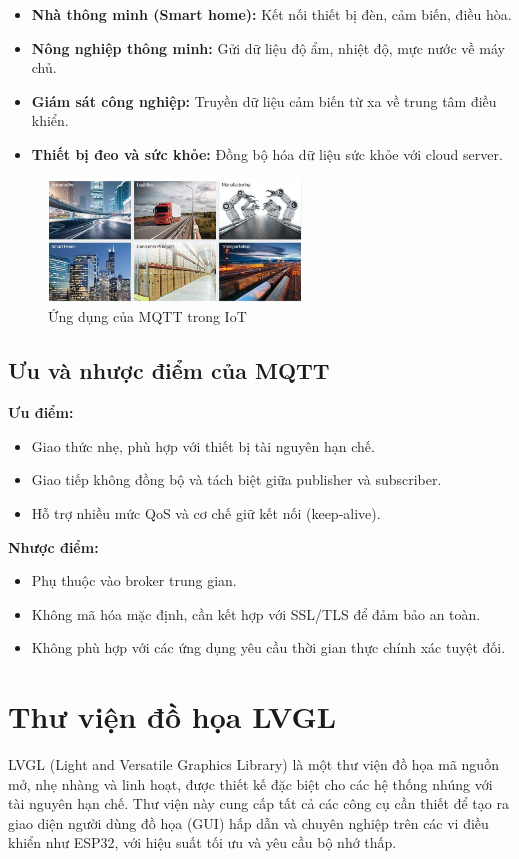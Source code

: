 \begin{itemize}
    \item \textbf{Nhà thông minh (Smart home):} Kết nối thiết bị đèn, cảm biến, điều hòa.
    \item \textbf{Nông nghiệp thông minh:} Gửi dữ liệu độ ẩm, nhiệt độ, mực nước về máy chủ.
    \item \textbf{Giám sát công nghiệp:} Truyền dữ liệu cảm biến từ xa về trung tâm điều khiển.
    \item \textbf{Thiết bị đeo và sức khỏe:} Đồng bộ hóa dữ liệu sức khỏe với cloud server.
\end{itemize}
\begin{figure}[H]
  \centering
  \includegraphics[width=0.6\textwidth]{Images/ung-dung-mqtt.png}
  \caption{Ứng dụng của MQTT trong IoT}
\end{figure}
\subsection{Ưu và nhược điểm của MQTT}

\textbf{Ưu điểm:}
\begin{itemize}
    \item Giao thức nhẹ, phù hợp với thiết bị tài nguyên hạn chế.
    \item Giao tiếp không đồng bộ và tách biệt giữa publisher và subscriber.
    \item Hỗ trợ nhiều mức QoS và cơ chế giữ kết nối (keep-alive).
\end{itemize}

\textbf{Nhược điểm:}
\begin{itemize}
    \item Phụ thuộc vào broker trung gian.
    \item Không mã hóa mặc định, cần kết hợp với SSL/TLS để đảm bảo an toàn.
    \item Không phù hợp với các ứng dụng yêu cầu thời gian thực chính xác tuyệt đối.
\end{itemize}

\section{Thư viện đồ họa LVGL}
\tab LVGL (Light and Versatile Graphics Library) là một thư viện đồ họa mã nguồn mở, nhẹ nhàng và linh hoạt, được thiết kế đặc biệt cho các hệ thống nhúng với tài nguyên hạn chế. Thư viện này cung cấp tất cả các công cụ cần thiết để tạo ra giao diện người dùng đồ họa (GUI) hấp dẫn và chuyên nghiệp trên các vi điều khiển như ESP32, với hiệu suất tối ưu và yêu cầu bộ nhớ thấp.
